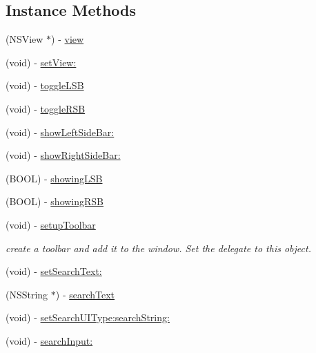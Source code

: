 \subsection*{Instance Methods}
\begin{DoxyCompactItemize}
\item 
(N\-S\-View $\ast$) -\/ \hyperlink{interface_window_host_controller_ac426656af30e3d0dc3b904ebcd81c38f}{view}
\item 
(void) -\/ \hyperlink{interface_window_host_controller_a9544a8dd4794dc764c2d74870c87ae35}{set\-View\-:}
\item 
(void) -\/ \hyperlink{interface_window_host_controller_a1bf9b440a8e52c664f8847c0ed02c130}{toggle\-L\-S\-B}
\item 
(void) -\/ \hyperlink{interface_window_host_controller_aab043bb063df00ed83d05b65f723b302}{toggle\-R\-S\-B}
\item 
(void) -\/ \hyperlink{interface_window_host_controller_aa015dcc15079fa85d78de55ddc852e08}{show\-Left\-Side\-Bar\-:}
\item 
(void) -\/ \hyperlink{interface_window_host_controller_adb9e833246bb7ec12598b796d5898dbb}{show\-Right\-Side\-Bar\-:}
\item 
(B\-O\-O\-L) -\/ \hyperlink{interface_window_host_controller_a425114580d8bb9f1d880d49a4157ec5b}{showing\-L\-S\-B}
\item 
(B\-O\-O\-L) -\/ \hyperlink{interface_window_host_controller_a94d97f9617c4545b4c290f258c7e1f9d}{showing\-R\-S\-B}
\item 
(void) -\/ \hyperlink{interface_window_host_controller_afb4c8baa0460815fc268a5c162e30b26}{setup\-Toolbar}
\begin{DoxyCompactList}\small\item\em create a toolbar and add it to the window. Set the delegate to this object. \end{DoxyCompactList}\item 
(void) -\/ \hyperlink{interface_window_host_controller_a3eb9aa435d54b4d7936ae7cdf3b9a544}{set\-Search\-Text\-:}
\item 
(N\-S\-String $\ast$) -\/ \hyperlink{interface_window_host_controller_a2a53926b5a6ba394220b139621c2c150}{search\-Text}
\item 
(void) -\/ \hyperlink{interface_window_host_controller_ac0acccdffaa9e7ca4e9e14dfa014a367}{set\-Search\-U\-I\-Type\-:search\-String\-:}
\item 
(void) -\/ \hyperlink{interface_window_host_controller_add828a61792981a971a62679c01ed72d}{search\-Input\-:}
\item 

\end{DoxyCompactItemize}
